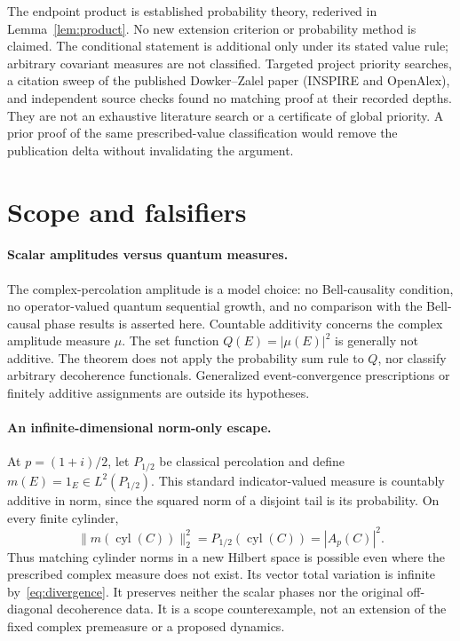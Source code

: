 \documentclass[11pt]{article}
\theoremstyle{definition}
\newcommand{\cyl}{\operatorname{cyl}}
\begin{document}
The endpoint product is established probability theory, rederived in
Lemma~\ref{lem:product}. No new extension criterion or probability method is
claimed. The conditional statement is additional only under its stated value
rule; arbitrary covariant measures are not classified. Targeted project
priority searches, a citation sweep of the published Dowker--Zalel paper
(INSPIRE and OpenAlex), and independent source checks found no matching proof at
their recorded depths. They are not an exhaustive literature search or a
certificate of global priority. A prior proof of the same prescribed-value
classification would remove the publication delta without invalidating the
argument.

\section{Scope and falsifiers}
\paragraph{Scalar amplitudes versus quantum measures.}
The complex-percolation amplitude is a model choice: no Bell-causality
condition, no operator-valued quantum sequential growth, and no comparison
with the Bell-causal phase results is asserted here. Countable additivity
concerns the complex amplitude measure $\mu$.
The set function $Q(E)=|\mu(E)|^2$ is generally not additive. The theorem
does not apply the probability sum rule to $Q$, nor classify arbitrary
decoherence functionals. Generalized event-convergence prescriptions or
finitely additive assignments are outside its hypotheses.

\paragraph{An infinite-dimensional norm-only escape.}
At $p=(1+i)/2$, let $P_{1/2}$ be classical percolation and define
$m(E)=1_E\in L^2(P_{1/2})$. This standard indicator-valued measure is
countably additive in norm, since the squared norm of a disjoint tail is
its probability. On every finite cylinder,
\[
 \|m(\cyl(C))\|_2^2
 =P_{1/2}(\cyl(C))=|A_p(C)|^2.
\]
Thus matching cylinder norms in a new Hilbert space is possible even where
the prescribed complex measure does not exist. Its vector total variation
is infinite by~\eqref{eq:divergence}. It preserves neither the scalar phases
nor the original off-diagonal decoherence data. It is a scope counterexample,
not an extension of the fixed complex premeasure or a proposed dynamics.
\end{document}
